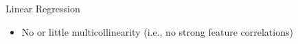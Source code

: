\documentclass[11pt,compress,t,notes=noshow, aspectratio=169, xcolor=table]{beamer}
\begin{document}
\begin{frame}[c]{Linear Regression}
\begin{itemize}[<+->]
    \item No or little multicollinearity (i.e., no strong feature correlations)
    \end{itemize}

\end{frame}

\end{document}
